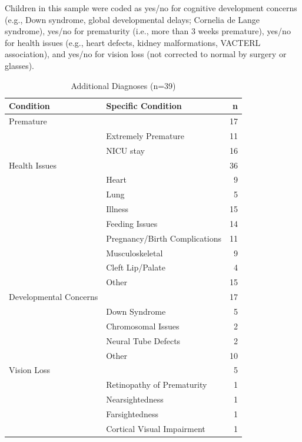 \documentclass[english,man]{apa6}
\begin{document}
\begin{table}

\caption{\label{tab:CDIinfo}CDI details}
\centering
{}
\end{table}

Children in this sample were coded as yes/no for cognitive development concerns (e.g., Down syndrome, global developmental delays; Cornelia de Lange syndrome), yes/no for prematurity (i.e., more than 3 weeks premature), yes/no for health issues (e.g., heart defects, kidney malformations, VACTERL association), and yes/no for vision loss (not corrected to normal by surgery or glasses).

\begin{longtable}[t]{l|l|r}
\caption{\label{tab:comorbid-info}Additional Diagnoses (n=39)}\\
\hline
Condition & Specific Condition & n\\
\hline
Premature &  & 17\\
\hline
 & Extremely Premature & 11\\
\hline
 & NICU stay & 16\\
\hline
Health Issues &  & 36\\
\hline
 & Heart & 9\\
\hline
 & Lung & 5\\
\hline
 & Illness & 15\\
\hline
 & Feeding Issues & 14\\
\hline
 & Pregnancy/Birth Complications & 11\\
\hline
 & Musculoskeletal & 9\\
\hline
 & Cleft Lip/Palate & 4\\
\hline
 & Other & 15\\
\hline
Developmental Concerns &  & 17\\
\hline
 & Down Syndrome & 5\\
\hline
 & Chromosomal Issues & 2\\
\hline
 & Neural Tube Defects & 2\\
\hline
 & Other & 10\\
\hline
Vision Loss &  & 5\\
\hline
 & Retinopathy of Prematurity & 1\\
\hline
 & Nearsightedness & 1\\
\hline
 & Farsightedness & 1\\
\hline
 & Cortical Visual Impairment & 1\\
\hline
\end{longtable}
\end{document}
